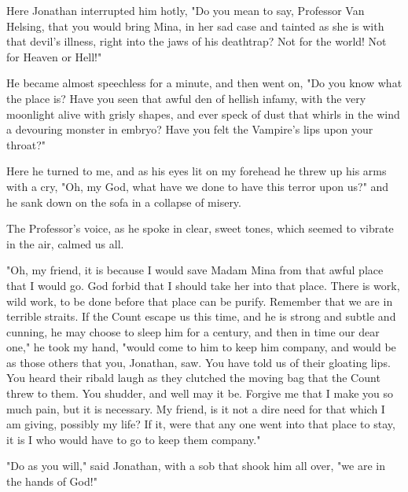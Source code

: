 Here Jonathan interrupted him hotly, "Do you mean to say, Professor Van Helsing, that you would bring Mina, in her sad case and tainted as she is with that devil's illness, right into the jaws of his deathtrap? Not for the world! Not for Heaven or Hell!" 

He became almost speechless for a minute, and then went on, "Do you know what the place is? Have you seen that awful den of hellish infamy, with the very moonlight alive with grisly shapes, and ever speck of dust that whirls in the wind a devouring monster in embryo? Have you felt the Vampire's lips upon your throat?" 

Here he turned to me, and as his eyes lit on my forehead he threw up his arms with a cry, "Oh, my God, what have we done to have this terror upon us?" and he sank down on the sofa in a collapse of misery. 

The Professor's voice, as he spoke in clear, sweet tones, which seemed to vibrate in the air, calmed us all. 

"Oh, my friend, it is because I would save Madam Mina from that awful place that I would go. God forbid that I should take her into that place. There is work, wild work, to be done before that place can be purify. Remember that we are in terrible straits. If the Count escape us this time, and he is strong and subtle and cunning, he may choose to sleep him for a century, and then in time our dear one," he took my hand, "would come to him to keep him company, and would be as those others that you, Jonathan, saw. You have told us of their gloating lips. You heard their ribald laugh as they clutched the moving bag that the Count threw to them. You shudder, and well may it be. Forgive me that I make you so much pain, but it is necessary. My friend, is it not a dire need for that which I am giving, possibly my life? If it, were that any one went into that place to stay, it is I who would have to go to keep them company." 

"Do as you will," said Jonathan, with a sob that shook him all over, "we are in the hands of God!" 

